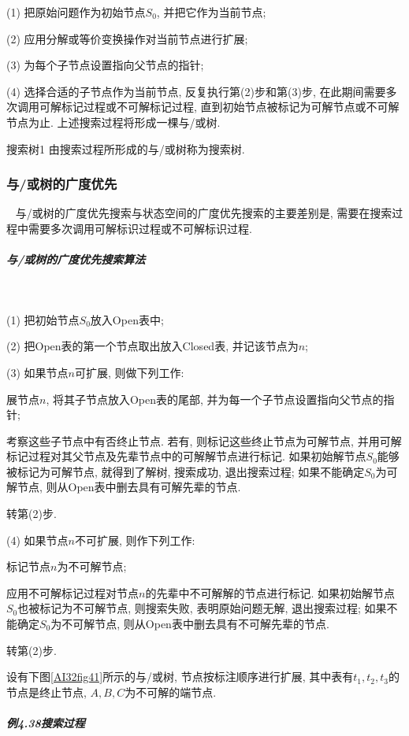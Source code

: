 (1) 把原始问题作为初始节点$S_0$, 并把它作为当前节点;

(2) 应用分解或等价变换操作对当前节点进行扩展;

(3) 为每个子节点设置指向父节点的指针;

(4) 选择合适的子节点作为当前节点, 反复执行第(2)步和第(3)步, 在此期间需要多次调用可解标记过程或不可解标记过程, 直到初始节点被标记为可解节点或不可解节点为止.
上述搜索过程将形成一棵与/或树.

\begin{mydef}{搜索树}{1}
    由搜索过程所形成的与/或树称为搜索树.
\end{mydef}
\subsubsection{与/或树的广度优先}~{}
    与/或树的广度优先搜索与状态空间的广度优先搜索的主要差别是, 需要在搜索过程中需要多次调用可解标识过程或不可解标识过程.
\subparagraph{与/或树的广度优先搜索算法}~{}

(1) 把初始节点$S_0$放入Open表中;

(2) 把Open表的第一个节点取出放入Closed表, 并记该节点为$n$;

(3) 如果节点$n$可扩展, 则做下列工作:

   \qquad {} 展节点$n$, 将其子节点放入Open表的尾部, 并为每一个子节点设置指向父节点的指针;

   \qquad{}  考察这些子节点中有否终止节点. 若有, 则标记这些终止节点为可解节点, 并用可解标记过程对其父节点及先辈节点中的可解解节点进行标记.
     如果初始解节点$S_0$能够被标记为可解节点, 就得到了解树, 搜索成功, 退出搜索过程;
     如果不能确定$S_0$为可解节点, 则从Open表中删去具有可解先辈的节点.

   \qquad{} 转第(2)步.

(4) 如果节点$n$不可扩展, 则作下列工作:

   \qquad  {} 标记节点$n$为不可解节点;

   \qquad  {} 应用不可解标记过程对节点$n$的先辈中不可解解的节点进行标记. 如果初始解节点$S_0$也被标记为不可解节点, 则搜索失败, 表明原始问题无解, 退出搜索过程; 如果不能确定$S_0$为不可解节点, 则从Open表中删去具有不可解先辈的节点.

   \qquad  {} 转第(2)步.
\begin{example}\label{AIC4examp4.38}
    设有下图\ref{AI32fig41}所示的与/或树, 节点按标注顺序进行扩展, 其中表有$t_1,t_2,t_3$的节点是终止节点, $A,B,C$为不可解的端节点.
\end{example}
\subparagraph{例4.38搜索过程}~{}

